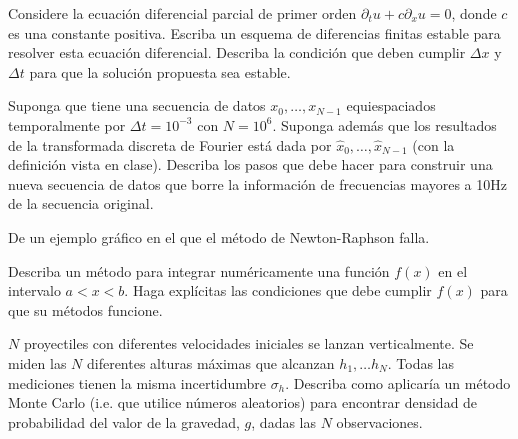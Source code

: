\documentclass[11pt,letterpaper]{exam}
\begin{document}
\begin{questions}
Considere la ecuaci\'on diferencial parcial de primer orden
$\partial_t u + c \partial_x u=0$, donde $c$ es una constante
positiva.
Escriba un esquema de diferencias finitas estable para resolver esta
ecuaci\'on diferencial. 
Describa la condici\'on que deben cumplir $\Delta x$ y
$\Delta t$ para que la soluci\'on propuesta sea estable.


Suponga que tiene una secuencia de datos $x_0, \ldots, x_{N-1}$
equiespaciados temporalmente por $\Delta t=10^{-3}$ con $N=10^6$.
Suponga adem\'as que los resultados de la transformada discreta de Fourier
est\'a dada por $\hat{x}_0, \ldots, \hat{x}_{N-1}$ (con la
  definici\'on vista en clase).
Describa los pasos que debe hacer para construir una nueva secuencia
de datos que borre la informaci\'on de frecuencias mayores a 10Hz de
la secuencia original.


De un ejemplo gr\'afico en el que el m\'etodo de Newton-Raphson falla.

Describa un m\'etodo para integrar num\'ericamente una funci\'on
$f(x)$ en el intervalo $a<x<b$. 
Haga expl\'icitas las condiciones que debe cumplir
$f(x)$ para que su m\'etodos funcione.


$N$ proyectiles con diferentes velocidades iniciales se lanzan
verticalmente. Se miden las $N$ diferentes alturas m\'aximas que 
alcanzan ${h_1,\ldots h_{N}}$. Todas las mediciones tienen la misma 
incertidumbre $\sigma_h$.
Describa como aplicar\'ia un m\'etodo Monte Carlo (i.e. que
utilice n\'umeros aleatorios) para encontrar densidad de probabilidad
del valor de la gravedad, $g$, dadas las $N$ observaciones.


\end{questions}
\end{document}

